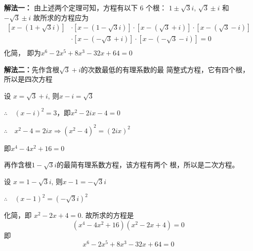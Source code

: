 \begin{solution}
\textbf{解法一：} 由上述两个定理可知，方程有以下 6 个根：
$1\pm\sqrt{3}i$, $\sqrt{3}\pm i$ 和$-\sqrt3\pm i$
故所求的方程应为    
\[\begin{split}
    [x-(1+\sqrt{3}i)]&\cdot [x-(1-\sqrt{3}i)]\cdot [x-(\sqrt{3}+i)]\cdot\left[x-(\sqrt{3}-i)\right]\\
&\cdot \left[x-(-\sqrt{3}+i)\right]\cdot\left[x-(-\sqrt{3}-i)\right]=0\\
\end{split}\]
化简， 即为$x^6-2x^5+8x^3-32x+64=0$

\textbf{解法二：}先作含根$\sqrt{3}+i$的次数最低的有理系数的最
简整式方程，它有四个根，所以是四次方程

设 $x= \sqrt {3}+i$, 则$x-i=\sqrt{3}$

$\therefore\quad (x-i)^2=3$，即$x^2-2ix-4=0$

$\therefore\quad x^2-4=2ix \Longrightarrow (x^2-4)^2=(2ix)^2$

即$x^4-4x^2+16=0$

再作含根$1-\sqrt{3}i$的最简有理系数方程，该方程有两个
根，所以是二次方程。

设 $x= 1- \sqrt {3}i$, 则$x-1=-\sqrt{3}i$

$\therefore\quad (x-1)^2=(-\sqrt{3}i)^2$


化简，即 $x^2-2x+4=0$. 故所求的方程是
$$(x^4-4x^2+16)(x^2-2x+4)=0$$
即$$x^6-2x^5+8x^3-32x+64=0$$
\end{solution}

